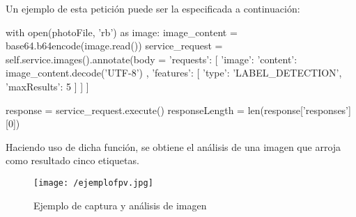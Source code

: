 Un ejemplo de esta petición puede ser la especificada a continuación:

\begin{listing}[
 float=h!,
 language = Python,
 caption = {Ejemplo de petición a Google Cloud Vision \acs{API} para la detección de etiquetas},
 label  = code:analisis]
with open(photoFile, 'rb') as image:
	image_content = base64.b64encode(image.read())
    service_request = self.service.images().annotate(body = {
    	'requests': [{
        	'image': {
          		'content': image_content.decode('UTF-8')
        			},
        		'features': [{
          			'type': 'LABEL_DETECTION',
          			'maxResults': 5
        		}]
      	}]
    }]
    
		
    response = service_request.execute()
	responseLength = len(response['responses'][0])
\end{listing}

Haciendo uso de dicha función, se obtiene el análisis de una imagen que arroja como resultado cinco etiquetas.  

\begin{figure}[!h]
\begin{center}
\texttt{[image: /ejemplofpv.jpg]}
\caption[Ejemplo de captura y análisis de imagen]{Ejemplo de captura y análisis de imagen}
\label{fig:ejemplofpv}
\end{center}
\end{figure}

